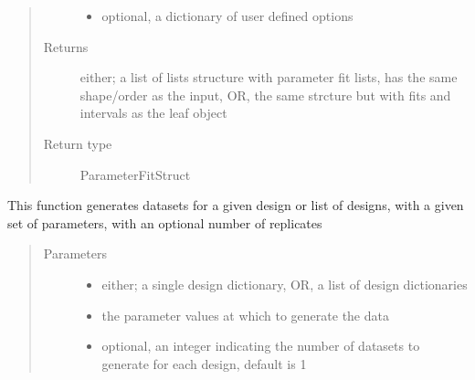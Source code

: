 \documentclass[letterpaper,10pt,english,openany,oneside]{sphinxmanual}
\begin{document}
\begin{fulllineitems}
\begin{fulllineitems}
\begin{quote}
\begin{description}
\begin{itemize}
\item {} 
 \textendash{} optional,  a dictionary of user defined options

\end{itemize}

\item[{Returns}] \leavevmode
either; a list of lists structure with parameter fit lists,  has the same shape/order as the input,  OR,  the same strcture but with fits and intervals as the leaf object

\item[{Return type}] \leavevmode
ParameterFitStruct

\end{description}\end{quote}

\end{fulllineitems}


\begin{fulllineitems}
\label{\detokenize{nloed:nloed.model.Model.sample}}
This function generates datasets for a given design or list of designs,
with a given set of parameters,  with an optional number of replicates
\begin{quote}\begin{description}
\item[{Parameters}] \leavevmode\begin{itemize}
\item {} 
 \textendash{} either; a single design dictionary,  OR,  a list of design dictionaries

\item {} 
 \textendash{} the parameter values at which to generate the data

\item {} 
 \textendash{} optional,  an integer indicating the number of datasets to generate for each design,  default is 1

\end{itemize}


\end{description}
\end{quote}
\end{fulllineitems}
\end{fulllineitems}
\end{document}
